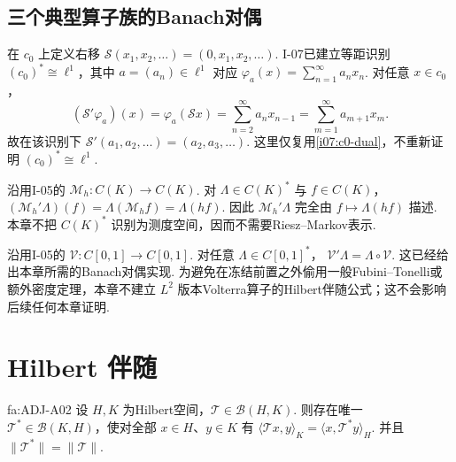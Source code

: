 \subsection{三个典型算子族的Banach对偶}

\begin{FAExample}\label{i11:shift-banach-dual}
在 \(\displaystyle c_0\) 上定义右移 \(\displaystyle \mathcal S(x_1,x_2,\dots)=(0,x_1,x_2,\dots)\). I-07已建立等距识别 \(\displaystyle (c_0)^*\cong\ell^1\)，其中 \(\displaystyle a=(a_n)\in\ell^1\) 对应 \(\displaystyle \varphi_a(x)=\sum_{n=1}^\infty a_nx_n\). 对任意 \(\displaystyle x\in c_0\)，
\[
(\mathcal S'\varphi_a)(x)
=\varphi_a(\mathcal Sx)
=\sum_{n=2}^{\infty}a_nx_{n-1}
=\sum_{m=1}^{\infty}a_{m+1}x_m.
\]
故在该识别下
\(\displaystyle \mathcal S'(a_1,a_2,\dots)=(a_2,a_3,\dots)\).
这里仅复用\autoref{i07:c0-dual}，不重新证明 \(\displaystyle (c_0)^*\cong\ell^1\).
\end{FAExample}

\begin{FAExample}
沿用I-05的 \(\displaystyle \mathcal M_h:C(K)\to C(K)\). 对 \(\displaystyle \Lambda\in C(K)^*\) 与 \(\displaystyle f\in C(K)\)，
\(\displaystyle (\mathcal M_h'\Lambda)(f) =\Lambda(\mathcal M_hf) =\Lambda(hf)\).
因此 \(\displaystyle \mathcal M_h'\Lambda\) 完全由 \(\displaystyle f\mapsto\Lambda(hf)\) 描述. 本章不把 \(\displaystyle C(K)^*\) 识别为测度空间，因而不需要Riesz--Markov表示.
\end{FAExample}

\begin{FAExample}[Banach对偶层复用]
沿用I-05的 \(\displaystyle \mathcal V:C[0,1]\to C[0,1]\). 对任意 \(\displaystyle \Lambda\in C[0,1]^*\)，
\(\displaystyle \mathcal V'\Lambda=\Lambda\circ\mathcal V\).
这已经给出本章所需的Banach对偶实现. 为避免在冻结前置之外偷用一般Fubini--Tonelli或额外密度定理，本章不建立 \(\displaystyle L^2\) 版本Volterra算子的Hilbert伴随公式；这不会影响后续任何本章证明.
\end{FAExample}

\section{Hilbert 伴随}\label{sec:i11-hilbert-adjoint}

\begin{FATheorem}[A][Hilbert伴随的存在唯一性]{fa:ADJ-A02}
设 \(\displaystyle H,K\) 为Hilbert空间，\(\displaystyle \mathcal T\in\mathcal B(H,K)\). 则存在唯一 \(\displaystyle \mathcal T^*\in\mathcal B(K,H)\)，使对全部 \(\displaystyle x\in H\)、\(\displaystyle y\in K\) 有
\(\displaystyle \langle\mathcal T x,y\rangle_K = \langle x,\mathcal T^*y\rangle_H\).
并且
\(\displaystyle \|\mathcal T^*\|=\|\mathcal T\|\).
\end{FATheorem}

